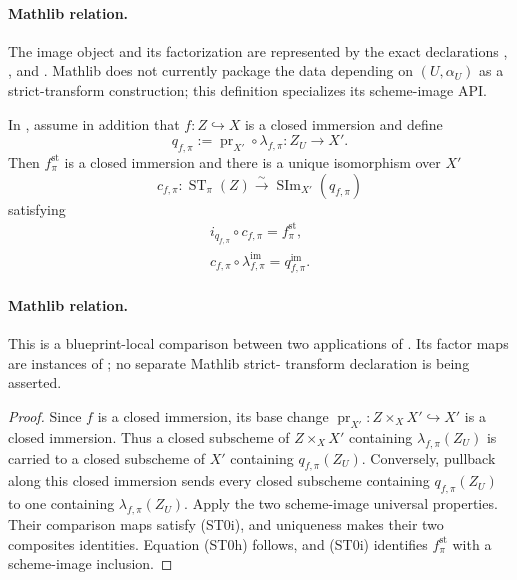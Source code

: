 \begin{definition}
  \paragraph{Mathlib relation.}
  The image object and its factorization are represented by the exact
  declarations \texttt{},
  \texttt{}, and
  \texttt{}.  Mathlib does not currently
  package the data depending on $(U,\alpha_U)$ as a strict-transform
  construction; this definition specializes its scheme-image API.
\end{definition}

\begin{lemma}
  \label{lemma:nagata-strict-transform-scheme-image-comparison}

  In , assume in addition that
  $f\colon Z\hookrightarrow X$ is a closed immersion and define
  \[
    q_{f,\pi}:=
      \operatorname{pr}_{X'}\circ\lambda_{f,\pi}
      \colon Z_U\longrightarrow X'.                             \tag{ST0g}
  \]
  Then $f^{\mathrm{st}}_\pi$ is a closed immersion and there is a unique
  isomorphism over $X'$
  \[
    c_{f,\pi}\colon
      \operatorname{ST}_{\pi}(Z)
        \xrightarrow{\sim}
      \operatorname{SIm}_{X'}(q_{f,\pi})                         \tag{ST0h}
  \]
  satisfying
  \[
  \begin{gathered}
    i_{q_{f,\pi}}\circ c_{f,\pi}=f^{\mathrm{st}}_\pi,\\
    c_{f,\pi}\circ\lambda_{f,\pi}^{\mathrm{im}}
      =q_{f,\pi}^{\mathrm{im}}.
  \end{gathered}                                                   \tag{ST0i}
  \]

  \paragraph{Mathlib relation.}
  This is a blueprint-local comparison between two applications of
  \texttt{}.  Its factor maps are instances of
  \texttt{}; no separate Mathlib strict-
  transform declaration is being asserted.
\end{lemma}

\begin{proof}
  Since $f$ is a closed immersion, its base change
  $\operatorname{pr}_{X'}\colon Z\times_XX'\hookrightarrow X'$ is a closed
  immersion.  Thus a closed subscheme of $Z\times_XX'$ containing
  $\lambda_{f,\pi}(Z_U)$ is carried to a closed subscheme of $X'$ containing
  $q_{f,\pi}(Z_U)$.  Conversely, pullback along this closed immersion sends
  every closed subscheme containing $q_{f,\pi}(Z_U)$ to one containing
  $\lambda_{f,\pi}(Z_U)$.  Apply the two scheme-image universal properties.
  Their comparison maps satisfy (ST0i), and uniqueness makes their two
  composites identities.  Equation (ST0h) follows, and (ST0i) identifies
  $f^{\mathrm{st}}_\pi$ with a scheme-image inclusion.
\end{proof}

